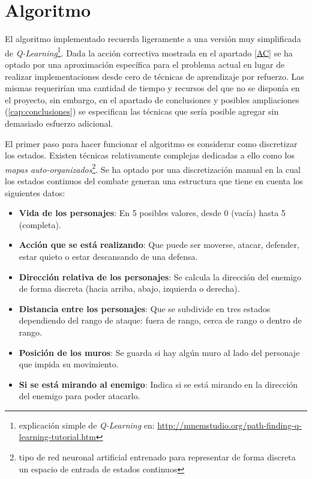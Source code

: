 \chapter{Algoritmo}

El algoritmo implementado recuerda ligeramente a una versión muy simplificada de \textit{Q-Learning}\footnote{explicación simple de \textit{Q-Learning} en: \url{http://mnemstudio.org/path-finding-q-learning-tutorial.htm}}. Dada la acción correctiva mostrada en el apartado \ref{AC} se ha optado por una aproximación específica para el problema actual en lugar de realizar implementaciones desde cero de técnicas de aprendizaje por refuerzo. Las mismas requerirían una cantidad de tiempo y recursos del que no se disponía en el proyecto, sin embargo, en el apartado de conclusiones y posibles ampliaciones (\ref{cap:conclusiones}) se especifican las técnicas que sería posible agregar sin demasiado esfuerzo adicional.

\bigskip

El primer paso para hacer funcionar el algoritmo es considerar como discretizar los estados. Existen técnicas relativamente complejas dedicadas a ello como los \textit{mapas auto-organizados}\footnote{tipo de red neuronal artificial entrenado para representar de forma discreta un espacio de entrada de estados continuos}. Se ha optado por una discretización manual en la cual los estados continuos del combate generan una estructura que tiene en cuenta los siguientes datos:

\begin{itemize}
	\item \textbf{Vida de los personajes}: En 5 posibles valores, desde 0 (vacía) hasta 5 (completa).
	\item \textbf{Acción que se está realizando}: Que puede ser moverse, atacar, defender, estar quieto o estar descansando de una defensa.
	\item \textbf{Dirección relativa de los personajes}: Se calcula la dirección del enemigo de forma discreta (hacia arriba, abajo, izquierda o derecha).
	\item \textbf{Distancia entre los personajes}: Que se subdivide en tres estados dependiendo del rango de ataque: fuera de rango, cerca de rango o dentro de rango.
	\item \textbf{Posición de los muros}: Se guarda si hay algún muro al lado del personaje que impida su movimiento.
	\item \textbf{Si se está mirando al enemigo}: Indica si se está mirando en la dirección del enemigo para poder atacarlo.
\end{itemize}

